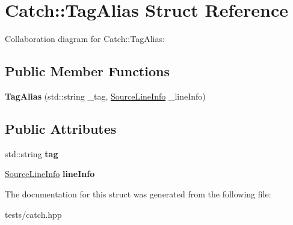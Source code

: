\hypertarget{struct_catch_1_1_tag_alias}{}\section{Catch\+:\+:Tag\+Alias Struct Reference}
\label{struct_catch_1_1_tag_alias}


Collaboration diagram for Catch\+:\+:Tag\+Alias\+:
\subsection*{Public Member Functions}
\begin{DoxyCompactItemize}
\item 
\mbox{\label{struct_catch_1_1_tag_alias_ad9124d03bfb6f767f1c97572330b05bc}} 
{\bfseries Tag\+Alias} (std\+::string \+\_\+tag, \hyperlink{struct_catch_1_1_source_line_info}{Source\+Line\+Info} \+\_\+line\+Info)
\end{DoxyCompactItemize}
\subsection*{Public Attributes}
\begin{DoxyCompactItemize}
\item 
\mbox{\label{struct_catch_1_1_tag_alias_a950183883ab17c90d0fab16b966b6e2d}} 
std\+::string {\bfseries tag}
\item 
\mbox{\label{struct_catch_1_1_tag_alias_a2f51fe0b3c052561275d26b6eb88f702}} 
\hyperlink{struct_catch_1_1_source_line_info}{Source\+Line\+Info} {\bfseries line\+Info}
\end{DoxyCompactItemize}


The documentation for this struct was generated from the following file\+:\begin{DoxyCompactItemize}
\item 
tests/catch.\+hpp\end{DoxyCompactItemize}
